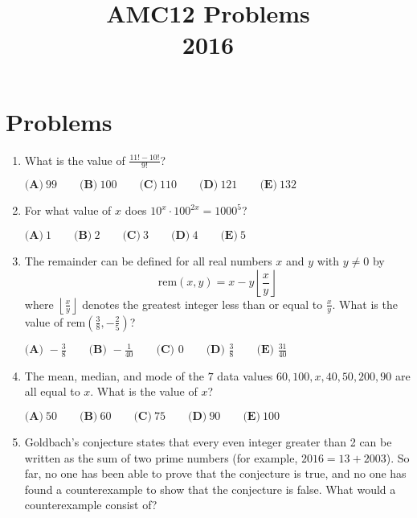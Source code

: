 \documentclass{article}
\title{AMC12 Problems \\ 2016}
\date{}
\begin{document}
\maketitle\thispagestyle{fancy}\newpage\section*{Problems}\begin{enumerate}[label=\arabic*., itemsep=0.5em]\item What is the value of \(\frac{11!-10!}{9!}\)?

\(\textbf{(A)}\ 99\qquad\textbf{(B)}\ 100\qquad\textbf{(C)}\ 110\qquad\textbf{(D)}\ 121\qquad\textbf{(E)}\ 132\)\par \vspace{0.5em}\item For what value of \(x\) does \(10^x \cdot 100^{2x} = 1000^5\)?

\(\textbf{(A)}\ 1\qquad\textbf{(B)}\ 2\qquad\textbf{(C)}\ 3\qquad\textbf{(D)}\ 4\qquad\textbf{(E)}\ 5\)\par \vspace{0.5em}\item The remainder can be defined for all real numbers \(x\) and \(y\) with \(y \neq 0\) by 
\begin{equation*}
\text{rem} (x ,y)=x-y\left \lfloor \frac{x}{y} \right \rfloor
\end{equation*}
where \(\left \lfloor \tfrac{x}{y} \right \rfloor\) denotes the greatest integer less than or equal to \(\tfrac{x}{y}\). What is the value of \(\text{rem} (\tfrac{3}{8}, -\tfrac{2}{5} )\)?

\(\textbf{(A) } -\frac{3}{8} \qquad \textbf{(B) } -\frac{1}{40} \qquad \textbf{(C) } 0 \qquad \textbf{(D) } \frac{3}{8} \qquad \textbf{(E) } \frac{31}{40}\)\par \vspace{0.5em}\item The mean, median, and mode of the \(7\) data values \(60, 100, x, 40, 50, 200, 90\) are all equal to \(x\). What is the value of \(x\)?

\(\textbf{(A)}\ 50\qquad\textbf{(B)}\ 60\qquad\textbf{(C)}\ 75\qquad\textbf{(D)}\ 90\qquad\textbf{(E)}\ 100\)\par \vspace{0.5em}\item Goldbach's conjecture states that every even integer greater than 2 can be written as the sum of two prime numbers (for example, \(2016=13+2003\)). So far, no one has been able to prove that the conjecture is true, and no one has found a counterexample to show that the conjecture is false. What would a counterexample consist of?


\end{enumerate}
\end{document}
